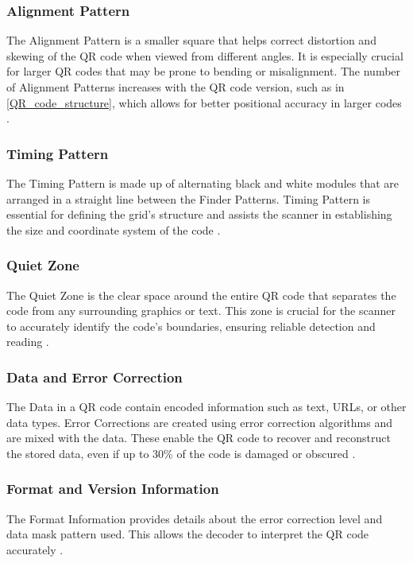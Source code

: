 \subsubsection*{Alignment Pattern}
The Alignment Pattern is a smaller square that helps correct distortion and skewing of the QR code when viewed from different angles. It is especially crucial for larger QR codes that may be prone to bending or misalignment. The number of Alignment Patterns increases with the QR code version, such as in \ref{QR_code_structure}, which allows for better positional accuracy in larger codes \cite{Tiwari2016}.

\subsubsection*{Timing Pattern}
The Timing Pattern is made up of alternating black and white modules that are arranged in a straight line between the Finder Patterns. Timing Pattern is essential for defining the grid's structure and assists the scanner in establishing the size and coordinate system of the code \cite{Tiwari2016}.

\subsubsection*{Quiet Zone}
The Quiet Zone is the clear space around the entire QR code that separates the code from any surrounding graphics or text. This zone is crucial for the scanner to accurately identify the code's boundaries, ensuring reliable detection and reading \cite{Tiwari2016}.

\subsubsection*{Data and Error Correction}
The Data in a QR code contain encoded information such as text, URLs, or other data types. Error Corrections are created using error correction algorithms and are mixed with the data. These enable the QR code to recover and reconstruct the stored data, even if up to 30\% of the code is damaged or obscured \cite{Tiwari2016}.

\subsubsection*{Format and Version Information}
The Format Information provides details about the error correction level and data mask pattern used. This allows the decoder to interpret the QR code accurately \cite{Tiwari2016}.

